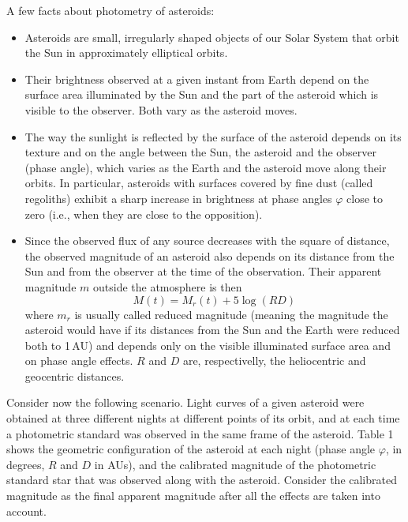 A few facts about photometry of asteroids:
\begin{itemize}
\item Asteroids are small, irregularly shaped objects of our Solar System
  that orbit the Sun in approximately elliptical orbits.
\item Their brightness observed at a given instant from Earth depend on the
  surface area illuminated by the Sun and the part of the asteroid which is
  visible to the observer. Both vary as the asteroid moves.
\item The way the sunlight is reflected by the surface of the asteroid
  depends on its texture and on the angle between the Sun, the asteroid and
  the observer (phase angle), which varies as the Earth and the asteroid move
  along their orbits. In particular, asteroids with surfaces covered by fine
  dust (called regoliths) exhibit a sharp increase in brightness at phase
  angles $\varphi$ close to zero (i.e., when they are close to the
  opposition).
\item Since the observed flux of any source decreases with the square of
  distance, the observed magnitude of an asteroid also depends on its
  distance from the Sun and from the observer at the time of the observation.
  Their apparent magnitude $m$ outside the atmosphere is then
  \[ M(t) = M_r(t) + 5\log(RD) \]
  where $m_r$ is usually called reduced magnitude (meaning the magnitude the
  asteroid would have if its distances from the Sun and the Earth were
  reduced both to 1\,AU) and depends only on the visible illuminated surface
  area and on phase angle effects. $R$ and $D$ are, respectivelly, the
  heliocentric and geocentric distances.
\end{itemize}

Consider now the following scenario. Light curves of a given asteroid were
obtained at three different nights at different points of its orbit, and at
each time a photometric standard was observed in the same frame of the
asteroid. Table 1 shows the geometric configuration of the asteroid at each
night (phase angle $\varphi$, in degrees, $R$ and $D$ in AUs), and the
calibrated magnitude of the photometric standard star that was observed along
with the asteroid. Consider the calibrated magnitude as the final apparent
magnitude after all the effects are taken into account.


